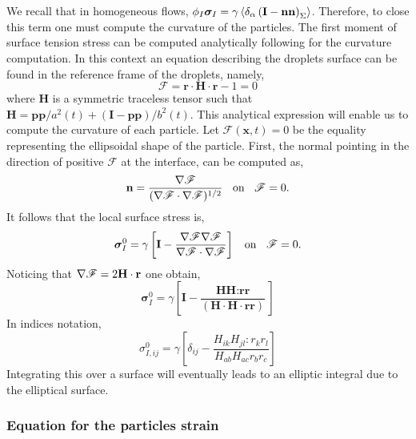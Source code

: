 We recall that in homogeneous flows, $\phi_I \bm{\sigma}_I = \gamma\left<\delta_\alpha \left( \textbf{I}-\textbf{nn} \right)_\Sigma\right>$. 
Therefore, to close this term one must compute the curvature of the particles. 
The first moment of surface tension stress can be computed analytically following \citep{nadim1996concise} for the curvature computation.
In this context an equation describing the droplets surface can be found in the reference frame of the droplets, namely, 
\begin{equation}
    \mathscr{F}
    = \textbf{r}\cdot \textbf{H}\cdot \textbf{r} - 1 = 0 
    \label{eq:F_def}
\end{equation}
where \textbf{H} is a symmetric traceless tensor such that $\textbf{H} = \textbf{pp}/a^2(t) + (\textbf{I}- \textbf{pp})/b^2(t)$. 
This analytical expression will enable us to compute the curvature of each particle.  
Let $\mathscr{F}(\textbf{x},t) = 0$ be the equality representing the ellipsoidal shape of the particle. 
First, the normal pointing in the direction of positive $\mathscr{F}$ at the interface, can be computed as, 
\begin{equation*}
    \textbf{n} = \frac{\mathbf{\nabla} \mathscr{F}}{(\mathbf{\nabla} \mathscr{F}\cdot \mathbf{\nabla} \mathscr{F})^{1/2}} \;\;\text{ on }\;\; \mathscr{F} = 0.  
\end{equation*}
It follows that the local surface stress is, 
\begin{equation*}
    \bm{\sigma}_I^0 =
    \gamma \left[\textbf{I} - \frac{\mathbf{\nabla} \mathscr{F} \mathbf{\nabla} \mathscr{F}}{\mathbf{\nabla} \mathscr{F}\cdot \mathbf{\nabla} \mathscr{F}}\right] \;\;\text{ on }\;\; \mathscr{F} = 0.  
\end{equation*}
Noticing that $\mathbf{\nabla} \mathscr{F} = 2\textbf{H}\cdot \textbf{r}$ one obtain, 
\begin{equation*}
    \bm{\sigma}_I^0 =\gamma\left[
    \textbf{I} - \frac{ \textbf{HH} :  \textbf{rr}}{ (\textbf{H}\cdot  \textbf{H}\cdot \textbf{rr})} \right]
\end{equation*}
In indices notation,  
\begin{equation*}
    \sigma_{I,ij}^0 =\gamma\left[
    \delta_{ij} - \frac{ H_{ik} H_{jl} :  r_kr_l}{  H_{ab}  H_{ac} r_br_c} \right]
\end{equation*}
Integrating this over a surface will eventually leads to an elliptic integral due to the elliptical surface. 
\subsubsection*{Equation for the particles strain}

